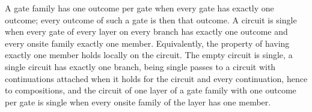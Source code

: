 \begin{definition}
    \label{def:circuits_single}
    \leanok
    A gate family has one outcome per gate when every gate has exactly one outcome;
    every outcome of such a gate is then that outcome. A circuit is single when every
    gate of every layer on every branch has exactly one outcome and every onsite family
    exactly one member. Equivalently, the property of having exactly one member holds
    locally on the circuit. The empty circuit is single, a single circuit has exactly one
    branch, being single passes to a circuit with continuations attached when it holds
    for the circuit and every continuation, hence to compositions, and the circuit of one
    layer of a gate family with one outcome per gate is single when every onsite family of
    the layer has one member.
\end{definition}

